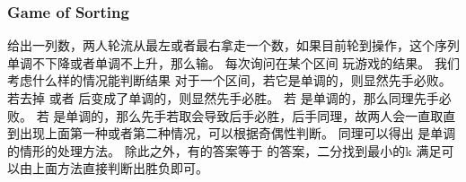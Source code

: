 \documentclass[8pt,a4paper]{article}
\newcommand{\txt}[1]{\par\noindent\footnotesize #1}
\newcommand{\inlineformula}[1]{\ensuremath{}}
\begin{document}
\begin{multicols}{2}
        \subsubsection{Game of Sorting}
            \txt{给出一列数，两人轮流从最左或者最右拿走一个数，如果目前轮到\inlineformula{./assets/formulas_tex/formula_625.tex}操作，这个序列单调不下降或者单调不上升，那么\inlineformula{./assets/formulas_tex/formula_626.tex}输。
每次询问在某个区间\inlineformula{./assets/formulas_tex/formula_627.tex} 玩游戏的结果。
我们考虑什么样的情况能判断结果
\inlineformula{./assets/formulas_tex/formula_628.tex}对于一个区间\inlineformula{./assets/formulas_tex/formula_629.tex}，若它是单调的，则显然先手必败。
\inlineformula{./assets/formulas_tex/formula_630.tex}若去掉\inlineformula{./assets/formulas_tex/formula_631.tex} 或者\inlineformula{./assets/formulas_tex/formula_632.tex} 后变成了单调的，则显然先手必胜。
\inlineformula{./assets/formulas_tex/formula_633.tex}若\inlineformula{./assets/formulas_tex/formula_634.tex} 是单调的，那么同理先手必败。
\inlineformula{./assets/formulas_tex/formula_635.tex}若\inlineformula{./assets/formulas_tex/formula_636.tex} 是单调的，那么先手若取\inlineformula{./assets/formulas_tex/formula_637.tex}会导致后手必胜，后手同理，故两人会一直取\inlineformula{./assets/formulas_tex/formula_638.tex}直到出现上面第一种或者第二种情况，可以根据奇偶性判断。
\inlineformula{./assets/formulas_tex/formula_639.tex}同理可以得出\inlineformula{./assets/formulas_tex/formula_640.tex} 是单调的情形的处理方法。
除此之外，有\inlineformula{./assets/formulas_tex/formula_641.tex}的答案等于\inlineformula{./assets/formulas_tex/formula_642.tex} 的答案，二分找到最小的k 满足\inlineformula{./assets/formulas_tex/formula_643.tex}可以由上面方法直接判断出胜负即可。}

\end{multicols}
\end{document}
